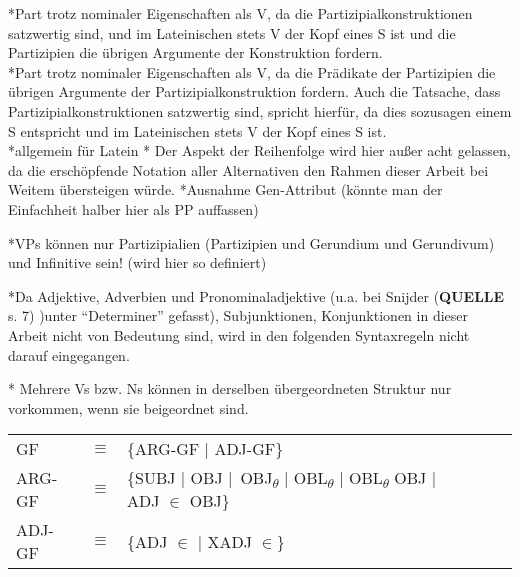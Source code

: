 \documentclass[12pt,a4paper]{article}
\begin{document}
*Part trotz nominaler Eigenschaften als V, da die Partizipialkonstruktionen satzwertig sind, und im Lateinischen stets V der Kopf eines S ist und die 
Partizipien die übrigen Argumente der Konstruktion fordern.\\

*Part trotz nominaler Eigenschaften als V, da die Prädikate der Partizipien die übrigen Argumente der Partizipialkonstruktion fordern. Auch die Tatsache, dass Partizipialkonstruktionen satzwertig sind, spricht hierfür, da dies sozusagen einem S entspricht und im Lateinischen stets V der Kopf eines S ist.\\


*allgemein für Latein
* Der Aspekt der Reihenfolge wird hier außer acht gelassen, da die erschöpfende Notation aller Alternativen den Rahmen dieser Arbeit bei Weitem übersteigen würde.
*Ausnahme Gen-Attribut (könnte man der Einfachheit halber hier als PP auffassen)

*VPs können nur Partizipialien (Partizipien und Gerundium und Gerundivum) und Infinitive sein! (wird hier so definiert)

*Da Adjektive, Adverbien und Pronominaladjektive (u.a. bei Snijder (\textbf{QUELLE} s. 7) )unter ``Determiner'' gefasst), Subjunktionen, Konjunktionen in dieser Arbeit nicht von Bedeutung sind, wird in den folgenden Syntaxregeln nicht darauf eingegangen. 

* Mehrere Vs bzw. Ns können in derselben übergeordneten Struktur nur vorkommen, wenn sie beigeordnet sind.

\begin{singlespace}
\begin{tabular}{ l  l  l  c  c  c  c }
GF & $\equiv$ & \{ARG-GF $\mid$ ADJ-GF\} \\
ARG-GF & $\equiv$ & \{SUBJ $\mid$ OBJ $\mid$\ OBJ\textsubscript{$\theta$} $\mid$ OBL\textsubscript{$\theta$} $\mid$ OBL\textsubscript{$\theta$} OBJ $\mid$ ADJ $\in$ OBJ\} \\
ADJ-GF & $\equiv$ & \{ADJ $\in$ $\mid$ XADJ $\in$\} \\
\end{tabular}\\
\end{singlespace}
\end{document}

